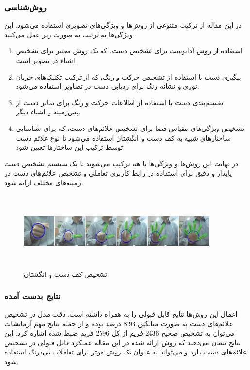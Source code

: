 \subsubsection{روش‌شناسی}
در  این مقاله از ترکیب متنوعی از روش‌ها و ویژگی‌های تصویری استفاده می‌شود. این ویژگی‌ها به ترتیب به صورت زیر عمل می‌کنند.
\begin{enumerate}
    \item استفاده از روش آدابوست
    برای تشخیص دست، که یک روش معتبر برای تشخیص اشیاء در تصویر است.
    \item پیگیری دست با استفاده از تشخیص حرکت و رنگ، که از ترکیب تکنیک‌های جریان نوری و نشانه رنگ برای ردیابی دست در تصاویر استفاده می‌شود.
    \item تقسیم‌بندی دست با استفاده از اطلاعات حرکت و رنگ برای تمایز دست از پس‌زمینه و اشیاء دیگر. 
    \item تشخیص ویژگی‌های مقیاس-فضا برای تشخیص علائم‌های دست، که برای شناسایی ساختارهای شبیه به کف دست و انگشتان استفاده می‌شود تا نوع علائم دست توسط ترکیب این ساختارها تعیین شود.
\end{enumerate}
  در نهایت این روش‌ها و ویژگی‌ها با هم ترکیب می‌شوند تا یک سیستم تشخیص دست پایدار و دقیق برای استفاده در رابط کاربری تعاملی و تشخیص علائم‌های دست در زمینه‌های مختلف ارائه شود.

\begin{figure}[h]
    \centering
    \includegraphics[height=4cm,width=0.9\textwidth]{hand_gesture_feature.png}
    \caption[تشخیص کف دست و انگشتان]{تشخیص کف دست و انگشتان \cite{fang2007real}}
\end{figure}

\subsubsection{نتایج بدست آمده}
اعمال این روش‌ها نتایج قابل قبولی را به همراه داشته است. دقت مدل در تشخیص علائم‌های دست به صورت میانگین 8.93 درصد بوده و از جمله نتایج مهم آزمایشات می‌توان به تشخیص 
صحیح 2436 فریم از کل 2596 فریم ضبط شده اشاره کرد. این نتایج نشان می‌دهند که روش ارائه شده در این مقاله عملکرد قابل قبولی در تشخیص علائم‌های دست دارد و 
می‌تواند به عنوان یک روش موثر برای تعاملات بی‌درنگ استفاده شود.



